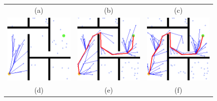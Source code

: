 \documentclass{article}
\begin{document}
\begin{figure}
{\begin{tabular}{ccc}
			(a) & (b) & (c)\\[6pt]
			\includegraphics[scale=0.45]{fmt_paths/n_samples/3.png} & \includegraphics[scale=0.45]{fmt_paths/n_samples/4.png} & \includegraphics[scale=0.45]{fmt_paths/n_samples/5.png}\\
			(d) & (e) & (f)\\[6pt]

\end{tabular}}
\end{figure}
\end{document}
